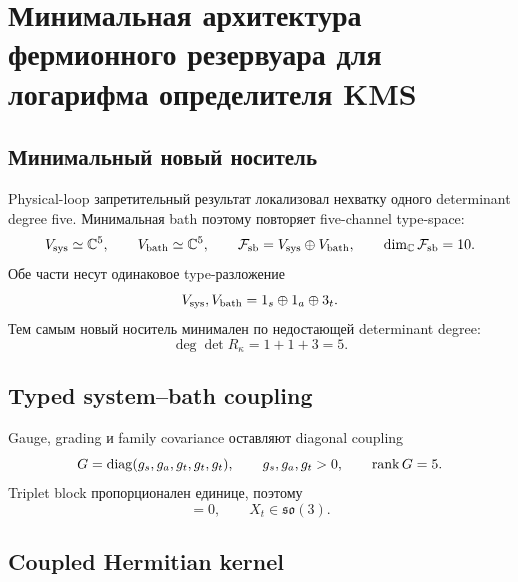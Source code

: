 \chapter{Минимальная архитектура фермионного резервуара для логарифма определителя KMS}
\label{ch:v9-kms-minimal-fermion-bath}

\section{Минимальный новый носитель}

Physical-loop запретительный результат локализовал нехватку одного determinant degree five.
Минимальная bath поэтому повторяет five-channel type-space:
\begin{equation}
 V_{\rm sys}\simeq\mathbb C^5,
 \qquad V_{\rm bath}\simeq\mathbb C^5,
 \qquad \mathcal F_{\rm sb}=V_{\rm sys}\oplus V_{\rm bath},
 \qquad \dim_{\mathbb C}\mathcal F_{\rm sb}=10.
 \label{eq:v9-kms-fermion-bath-carrier}
\end{equation}
Обе части несут одинаковое type-разложение
\begin{equation}
 V_{\rm sys},V_{\rm bath}=1_s\oplus1_a\oplus3_t.
 \label{eq:v9-kms-fermion-bath-types}
\end{equation}
Тем самым новый носитель минимален по недостающей determinant degree:
\begin{equation}
 \deg\det R_\kappa=1+1+3=5.
 \label{eq:v9-kms-fermion-bath-minimal-degree}
\end{equation}

\section{Typed system--bath coupling}

Gauge, grading и family covariance оставляют diagonal coupling
\begin{equation}
 G=\operatorname{diag}(g_s,g_a,g_t,g_t,g_t),
 \qquad g_s,g_a,g_t>0,
 \qquad \operatorname{rank} G=5.
 \label{eq:v9-kms-fermion-bath-coupling}
\end{equation}
Triplet block пропорционален единице, поэтому
\begin{equation}
 [G,0\oplus0\oplus X_t]=0,
 \qquad X_t\in\mathfrak{so}(3).
 \label{eq:v9-kms-fermion-bath-family-covariance}
\end{equation}

\section{Coupled Hermitian kernel}

